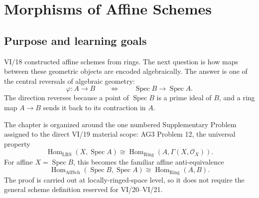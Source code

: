 
\chapter{Morphisms of Affine Schemes}
\label{ch:morphisms-affine-schemes}
\providecommand{\OO}{\mathcal O}
\providecommand{\Spec}{\operatorname{Spec}}
\providecommand{\GammaX}{\Gamma(X,\mathcal O_X)}
\providecommand{\mfp}{\mathfrak p}
\providecommand{\mfq}{\mathfrak q}
\providecommand{\mfm}{\mathfrak m}
\providecommand{\Frac}{\operatorname{Frac}}
\providecommand{\A}{\mathbb A}
\providecommand{\kappaof}[1]{\kappa(#1)}

\section*{Purpose and learning goals}

VI/18 constructed affine schemes from rings.  The next question is how maps between these
geometric objects are encoded algebraically.  The answer is one of the central reversals of
algebraic geometry:
\[
\boxed{
  \varphi:A\longrightarrow B
  \qquad\Longleftrightarrow\qquad
  \Spec B\longrightarrow\Spec A.
}
\]
The direction reverses because a point of $\Spec B$ is a prime ideal of $B$, and a ring map
$A\to B$ sends it back to its contraction in $A$.

The chapter is organized around the one numbered Supplementary Problem assigned to the direct
VI/19 material scope: AG3 Problem 12, the universal property
\[
\boxed{
\operatorname{Hom}_{\mathrm{LRS}}(X,\Spec A)
\cong
\operatorname{Hom}_{\mathrm{Ring}}(A,\Gamma(X,\OO_X)).
}
\]
For affine $X=\Spec B$, this becomes the familiar affine anti-equivalence
\[
\operatorname{Hom}_{\mathrm{AffSch}}(\Spec B,\Spec A)
\cong
\operatorname{Hom}_{\mathrm{Ring}}(A,B).
\]
The proof is carried out at locally-ringed-space level, so it does not require the general
scheme definition reserved for VI/20--VI/21.

